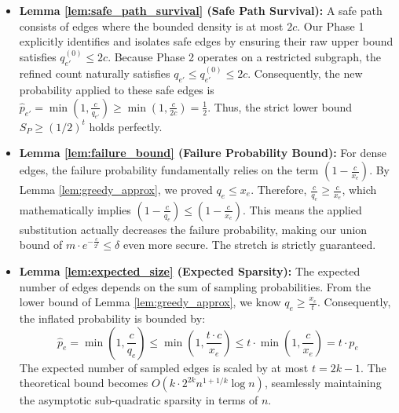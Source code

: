 \documentclass[11pt,a4paper]{article}
\begin{document}
\begin{itemize}
    \item \textbf{Lemma \ref{lem:safe_path_survival} (Safe Path Survival):} A safe path consists of edges where the bounded density is at most $2c$. Our Phase 1 explicitly identifies and isolates safe edges by ensuring their raw upper bound satisfies $q_{e'}^{(0)} \le 2c$. Because Phase 2 operates on a restricted subgraph, the refined count naturally satisfies $q_{e'} \le q_{e'}^{(0)} \le 2c$. Consequently, the new probability applied to these safe edges is $\hat{p}_{e'} = \min\left(1, \frac{c}{q_{e'}}\right) \ge \min\left(1, \frac{c}{2c}\right) = \frac{1}{2}$. Thus, the strict lower bound $S_P \ge (1/2)^t$ holds perfectly.
    
    \item \textbf{Lemma \ref{lem:failure_bound} (Failure Probability Bound):} For dense edges, the failure probability fundamentally relies on the term $(1 - \frac{c}{x_e})$. By Lemma \ref{lem:greedy_approx}, we proved $q_e \le x_e$. Therefore, $\frac{c}{q_e} \ge \frac{c}{x_e}$, which mathematically implies $\left(1 - \frac{c}{q_e}\right) \le \left(1 - \frac{c}{x_e}\right)$. This means the applied substitution actually decreases the failure probability, making our union bound of $m \cdot e^{-\frac{c}{2^t}} \le \delta$ even more secure. The stretch is strictly guaranteed.
    
    \item \textbf{Lemma \ref{lem:expected_size} (Expected Sparsity):} The expected number of edges depends on the sum of sampling probabilities. From the lower bound of Lemma \ref{lem:greedy_approx}, we know $q_e \ge \frac{x_e}{t}$. Consequently, the inflated probability is bounded by:
    \[
    \hat{p}_e = \min\left(1, \frac{c}{q_e}\right) \le \min\left(1, \frac{t \cdot c}{x_e}\right) \le t \cdot \min\left(1, \frac{c}{x_e}\right) = t \cdot p_e
    \]
    The expected number of sampled edges is scaled by at most $t = 2k-1$. The theoretical bound becomes $O(k \cdot 2^{2k} n^{1+1/k} \log n)$, seamlessly maintaining the asymptotic sub-quadratic sparsity in terms of $n$.
\end{itemize}

\end{document}
